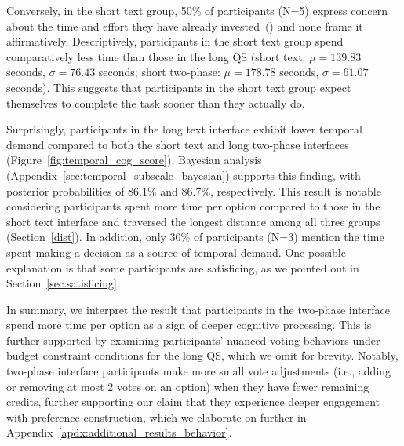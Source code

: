 Conversely, in the short text group, 50\% of participants (N=5) express concern about the time and effort they have already invested~() and none frame it affirmatively. Descriptively, participants in the short text group spend comparatively less time than those in the long QS (short text: $\mu=139.83$ seconds, $\sigma=76.43$ seconds; short two-phase: $\mu=178.78$ seconds, $\sigma=61.07$ seconds). This suggests that participants in the short text group expect themselves to complete the task sooner than they actually do. 


Surprisingly, participants in the long text interface exhibit lower temporal demand compared to both the short text and long two-phase interfaces (Figure~\ref{fig:temporal_cog_score}). Bayesian analysis (Appendix~\ref{sec:temporal_subscale_bayesian}) supports this finding, with posterior probabilities of 86.1\% and 86.7\%, respectively. This result is notable considering participants spent more time per option compared to those in the short text interface and traversed the longest distance among all three groups (Section~\ref{dist}). In addition, only 30\% of participants (N=3) mention the time spent making a decision as a source of temporal demand. One possible explanation is that some participants are satisficing, as we pointed out in Section~\ref{sec:satisficing}.  

In summary, we interpret the result that participants in the two-phase interface spend more time per option as a sign of deeper cognitive processing. This is further supported by examining participants' nuanced voting behaviors under budget constraint conditions for the long QS, which we omit for brevity. Notably, two-phase interface participants make more small vote adjustments (i.e., adding or removing at most 2 votes on an option) when they have fewer remaining credits, further supporting our claim that they experience deeper engagement with preference construction, which we elaborate on further in Appendix~\ref{apdx:additional_results_behavior}.

